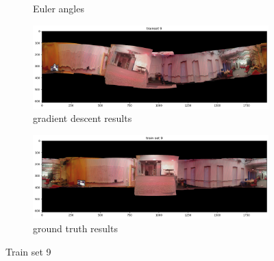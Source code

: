 \documentclass[conference]{IEEEtran}
\begin{document}
\begin{figure}[h]
\begin{subfigure}{0.4\textwidth}
        \caption{Euler angles}
    \end{subfigure}
    \begin{subfigure}{0.4\textwidth}
        \includegraphics[width=\linewidth]{../img/pano_9_gd.png}
        \caption{gradient descent results}
    \end{subfigure}
    \begin{subfigure}{0.4\textwidth}
        \includegraphics[width=\linewidth]{../img/pano_9_gt.png}
        \caption{ground truth results}
    \end{subfigure}

    \caption{Train set 9}
    \label{fig:set9}
\end{figure}
\end{document}
